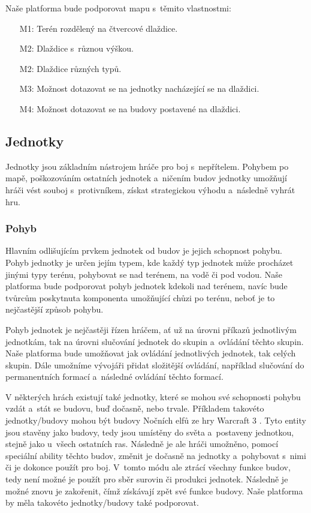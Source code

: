 
Naše platforma bude podporovat mapu s~těmito vlastnostmi:
\begin{itemize}
	\item[M1:] Terén rozdělený na čtvercové dlaždice.
	\item[M2:] Dlaždice s~různou výškou.
	\item[M2:] Dlaždice různých typů.
	\item[M3:] Možnost dotazovat se na jednotky nacházející se na dlaždici.
	\item[M4:] Možnost dotazovat se na budovy postavené na dlaždici.
\end{itemize}
\subsection{Jednotky}
\label{sec:jednotky}
Jednotky jsou základním nástrojem hráče pro boj s~nepřítelem. Pohybem po mapě, poškozováním ostatních jednotek a~ničením budov jednotky umožňují hráči vést souboj s~protivníkem, získat strategickou výhodu a~následně vyhrát hru. 

\subsubsection{Pohyb}
Hlavním odlišujícím prvkem jednotek od budov je jejich schopnost pohybu. Pohyb jednotky je určen jejím typem, kde každý typ jednotek může procházet jinými typy terénu, pohybovat se nad terénem, na vodě či pod vodou. Naše platforma bude podporovat pohyb jednotek kdekoli nad terénem, navíc bude tvůrcům poskytnuta komponenta umožňující chůzi po terénu, neboť je to nejčastější způsob pohybu. 

Pohyb jednotek je nejčastěji řízen hráčem, ať už na úrovni příkazů jednotlivým jednotkám, tak na úrovni slučování jednotek do skupin a~ovládání těchto skupin. Naše platforma bude umožňovat jak ovládání jednotlivých jednotek, tak celých skupin. Dále umožníme vývojáři přidat složitější ovládání, například slučování do permanentních formací a~následné ovládání těchto formací. 

V některých hrách existují také jednotky, které se mohou své schopnosti pohybu vzdát a~stát se budovu, buď dočasně, nebo trvale. Příkladem takovéto jednotky/budovy mohou být budovy Nočních elfů ze hry Warcraft 3 \citep{site:warcraft3}. Tyto entity jsou stavěny jako budovy, tedy jsou umístěny do světa a~postaveny jednotkou, stejně jako u~všech ostatních ras. Následně je ale hráči umožněno, pomocí speciální ability těchto budov, změnit je dočasně na jednotky a~pohybovat s~nimi či je dokonce použít pro boj. V~tomto módu ale ztrácí všechny funkce budov, tedy není možné je použít pro sběr surovin či produkci jednotek. Následně je možné znovu je zakořenit, čímž získávají zpět své funkce budovy.  Naše platforma by měla takovéto jednotky/budovy také podporovat. 

